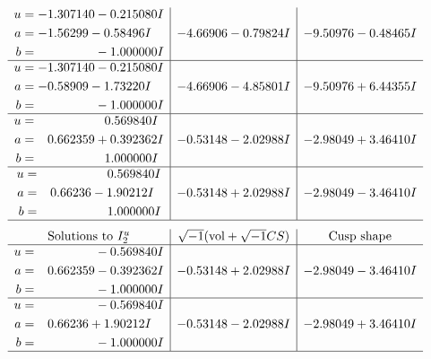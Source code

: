 \documentclass[1p]{elsarticle_modified}
\theoremstyle{definition}
\newcommand{\I}{\sqrt{-1}}
\begin{document}
$$\begin{array}{c|c|c}
\begin{aligned}
u &= -1.307140 - 0.215080 I \\
a &= -1.56299 - 0.58496 I \\
b &= \phantom{-0.000000 } -1.000000 I\end{aligned}
 & -4.66906 - 0.79824 I & -9.50976 - 0.48465 I \\ \hline\begin{aligned}
u &= -1.307140 - 0.215080 I \\
a &= -0.58909 - 1.73220 I \\
b &= \phantom{-0.000000 } -1.000000 I\end{aligned}
 & -4.66906 - 4.85801 I & -9.50976 + 6.44355 I \\ \hline\begin{aligned}
u &= \phantom{-0.000000 -}0.569840 I \\
a &= \phantom{-}0.662359 + 0.392362 I \\
b &= \phantom{-0.000000 -}1.000000 I\end{aligned}
 & -0.53148 - 2.02988 I & -2.98049 + 3.46410 I \\ \hline\begin{aligned}
u &= \phantom{-0.000000 -}0.569840 I \\
a &= \phantom{-}0.66236 - 1.90212 I \\
b &= \phantom{-0.000000 -}1.000000 I\end{aligned}
 & -0.53148 + 2.02988 I & -2.98049 - 3.46410 I\\
 \hline 
 \end{array}$$\newpage$$\begin{array}{c|c|c}  
\text{Solutions to }I^u_{2}& \I (\text{vol} + \sqrt{-1}CS) & \text{Cusp shape}\\
 \hline 
\begin{aligned}
u &= \phantom{-0.000000 } -0.569840 I \\
a &= \phantom{-}0.662359 - 0.392362 I \\
b &= \phantom{-0.000000 } -1.000000 I\end{aligned}
 & -0.53148 + 2.02988 I & -2.98049 - 3.46410 I \\ \hline\begin{aligned}
u &= \phantom{-0.000000 } -0.569840 I \\
a &= \phantom{-}0.66236 + 1.90212 I \\
b &= \phantom{-0.000000 } -1.000000 I\end{aligned}
 & -0.53148 - 2.02988 I & -2.98049 + 3.46410 I\\
 \hline 
 \end{array}$$\newpage
\end{document}
